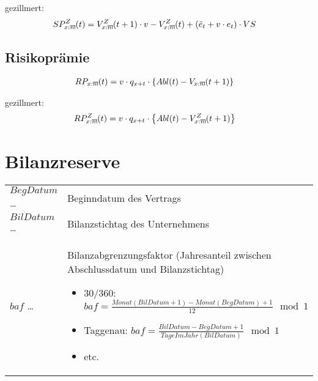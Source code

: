 \documentclass[a4paper,10pt]{article}
\makeatletter
\newcommand{\xn}{{\act[x]{n}}}
\DeclareRobustCommand{\act}[2][]{%
\def\arraystretch{0}%
\setlength\arraycolsep{0.5pt}%
\setlength\arrayrulewidth{0.5pt}%
\setbox0=\hbox{$\scriptstyle#1\ifx#1\empty{asdf}\else:\fi#2$}%
\begin{array}[b]{*2{@{}>{\scriptstyle}c}|}
\cline{2-2}%
\rule[1.25pt]{0pt}{\ht0}%
#1\ifx#1\empty\else:\fi & #2%
\end{array}%
}
\makeatother
\begin{document}
gezillmert: 
\begin{align*}
SP^Z_\xn(t) &= V^Z_\xn(t+1) \cdot v - V^Z_\xn(t) + \left(\ddot{e}_t + v\cdot e_t\right)\cdot VS
\end{align*}

\subsection{Risikoprämie}
\begin{align*}
RP_\xn(t) &= v\cdot q_{x+t} \cdot \left\{Abl(t) - V_\xn(t+1)\right\} 
\end{align*}

gezillmert: 
\begin{align*}
RP^Z_\xn(t) &= v\cdot q_{x+t} \cdot \left\{Abl(t) - V^Z_\xn(t+1)\right\} 
\end{align*}



\section{Bilanzreserve}

\begin{tabular}{lp{14cm}}
$BegDatum$ \dots & Beginndatum des Vertrags\\
$BilDatum$ \dots & Bilanzstichtag  des Unternehmens\\
$baf$ \dots & Bilanzabgrenzungsfaktor (Jahresanteil zwischen Abschlussdatum und Bilanzstichtag)
\begin{itemize}
 \item 30/360: $baf=\frac{Monat(BilDatum+1)-Monat(BegDatum)+1}{12} \mod 1$
 \item Taggenau: $baf=\frac{BilDatum-BegDatum+1}{TageImJahr(BilDatum)} \mod 1$
 \item etc.
\end{itemize}
\\
\end{tabular}
\end{document}
